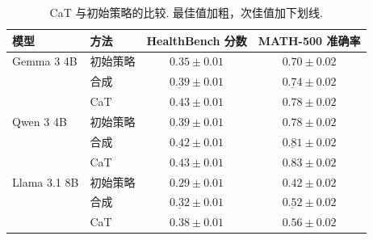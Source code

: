 \begin{longtable}{llcc}
\caption{CaT 与初始策略的比较. 最佳值加粗，次佳值加下划线.}\label{cat-tab:results-table}\\

        \toprule
        模型 & 方法 & HealthBench 分数 & MATH-500 准确率 \\
        \midrule
        Gemma 3 4B 
        & 初始策略 & $0.35 \pm 0.01$ & $0.70 \pm 0.02$ \\
        & 合成     & $\underline{0.39} \pm 0.01$ & $\underline{0.74} \pm 0.02$ \\
        & CaT  & $\mathbf{0.43} \pm 0.01$ & $\mathbf{0.78} \pm 0.02$ \\
        \midrule
        Qwen 3 4B 
        & 初始策略 & $0.39 \pm 0.01$ & $0.78 \pm 0.02$ \\
        & 合成     & $\underline{0.42} \pm 0.01$ & $\underline{0.81} \pm 0.02$ \\
        & CaT  & $\mathbf{0.43} \pm 0.01$ & $\mathbf{0.83} \pm 0.02$ \\
        \midrule
        Llama 3.1 8B
        & 初始策略 & $0.29 \pm 0.01$ & $0.42 \pm 0.02$ \\
        & 合成     & $\underline{0.32} \pm 0.01$ & $\underline{0.52} \pm 0.02$ \\
        & CaT  & $\mathbf{0.38} \pm 0.01$ & $\mathbf{0.56} \pm 0.02$ \\
        \bottomrule
    
\end{longtable}
